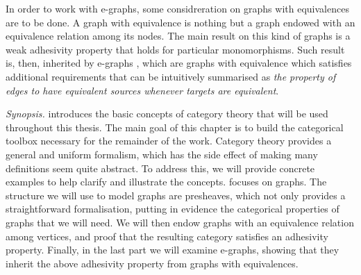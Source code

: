 In order to work with e-graphs, some considreration on graphs with equivalences are to be done. 
A graph with equivalence is nothing but a graph endowed with an equivalence relation among its nodes. 
The main result on this kind of graphs is a weak adhesivity property that holds for particular monomorphisms. 
Such result is, then, inherited by e-graphs , 
which are graphs with equivalence which satisfies additional requirements that can be intuitively summarised 
as \textit{the property of edges to have equivalent sources whenever targets are equivalent}.
\fi 

\smallskip \emph{Synopsis.}  introduces the basic concepts of category theory that will be used throughout this thesis. The main goal of this chapter is to build the categorical toolbox necessary for the remainder of the work. Category theory provides a general and uniform formalism, which has the side effect of making many definitions seem quite abstract. To address this, we will provide concrete examples to help clarify and illustrate the concepts.
 focuses on graphs. The structure we will use to model graphs are presheaves, which not only provides a straightforward formalisation, putting in evidence the categorical properties of graphs that we will need.  We will then endow graphs with an equivalence relation among vertices, and proof that the resulting category satisfies an adhesivity property. Finally, in the last part we will examine
 e-graphs, showing that they inherit the above adhesivity property from graphs with equivalences.


